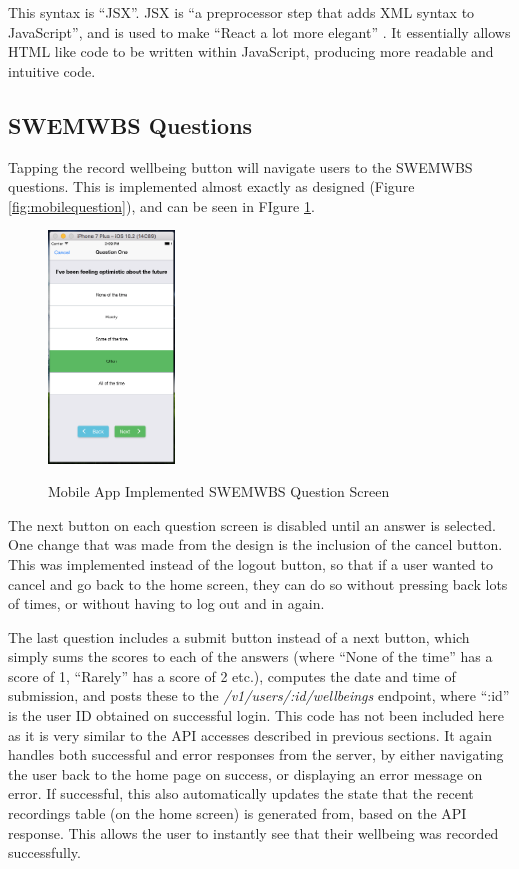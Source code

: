 \documentclass[11pt,openright,a4paper]{report}
\begin{document}
This syntax is \enquote{JSX}. JSX is \enquote{a preprocessor step that adds XML syntax to JavaScript}, and is used to make \enquote{React a lot more elegant} \parencite{jsx}. It essentially allows HTML like code to be written within JavaScript, producing more readable and intuitive code.

\subsection{SWEMWBS Questions}
Tapping the record wellbeing button will navigate users to the SWEMWBS questions. This is implemented almost exactly as designed (Figure \ref{fig:mobilequestion}), and can be seen in FIgure \ref{fig:mobilequestionimpl}.

\begin{figure}[ht]
\centering
\caption{Mobile App Implemented SWEMWBS Question Screen}
\includegraphics[width=0.3\textwidth]{i/mobilequestionimpl.png}
\label{fig:mobilequestionimpl}
\end{figure}

The next button on each question screen is disabled until an answer is selected. One change that was made from the design is the inclusion of the cancel button. This was implemented instead of the logout button, so that if a user wanted to cancel and go back to the home screen, they can do so without pressing back lots of times, or without having to log out and in again.

The last question includes a submit button instead of a next button, which simply sums the scores to each of the answers (where \enquote{None of the time} has a score of 1, \enquote{Rarely} has a score of 2 etc.), computes the date and time of submission, and posts these to the \emph{/v1/users/:id/wellbeings} endpoint, where \enquote{:id} is the user ID obtained on successful login. This code has not been included here as it is very similar to the API accesses described in previous sections. It again handles both successful and error responses from the server, by either navigating the user back to the home page on success, or displaying an error message on error. If successful, this also automatically updates the state that the recent recordings table (on the home screen) is generated from, based on the API response. This allows the user to instantly see that their wellbeing was recorded successfully.
\end{document}
